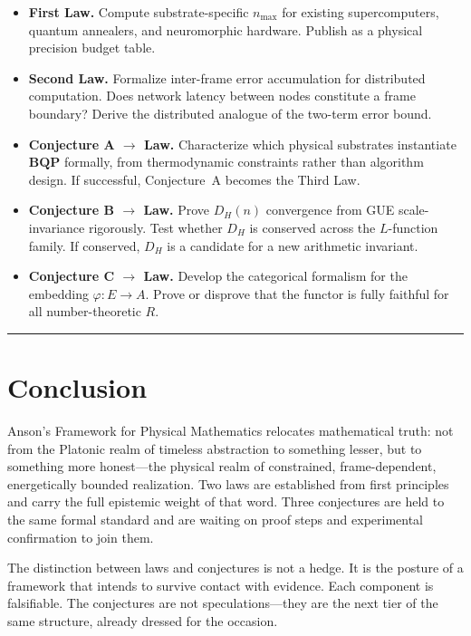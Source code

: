 \documentclass[12pt]{article}
\theoremstyle{lawstyle}
\theoremstyle{conjstyle}
\theoremstyle{predstyle}
\begin{document}
\begin{itemize}[itemsep=6pt]
  \item \textbf{First Law.} Compute substrate-specific $n_{\max}$ for existing
    supercomputers, quantum annealers, and neuromorphic hardware. Publish as a physical
    precision budget table.

  \item \textbf{Second Law.} Formalize inter-frame error accumulation for distributed
    computation. Does network latency between nodes constitute a frame boundary? Derive the
    distributed analogue of the two-term error bound.

  \item \textbf{Conjecture A $\to$ Law.} Characterize which physical substrates instantiate
    $\mathbf{BQP}$ formally, from thermodynamic constraints rather than algorithm design.
    If successful, Conjecture~A becomes the Third Law.

  \item \textbf{Conjecture B $\to$ Law.} Prove $D_H(n)$ convergence from GUE
    scale-invariance rigorously. Test whether $D_H$ is conserved across the $L$-function
    family. If conserved, $D_H$ is a candidate for a new arithmetic invariant.

  \item \textbf{Conjecture C $\to$ Law.} Develop the categorical formalism for the embedding
    $\varphi: E \to A$. Prove or disprove that the functor is fully faithful for all
    number-theoretic $R$.
\end{itemize}

\bigskip
\hrule
\bigskip

\section{Conclusion}

Anson's Framework for Physical Mathematics relocates mathematical truth: not from the
Platonic realm of timeless abstraction to something lesser, but to something more
honest---the physical realm of constrained, frame-dependent, energetically bounded
realization. Two laws are established from first principles and carry the full epistemic
weight of that word. Three conjectures are held to the same formal standard and are waiting
on proof steps and experimental confirmation to join them.

The distinction between laws and conjectures is not a hedge. It is the posture of a
framework that intends to survive contact with evidence. Each component is falsifiable. The
conjectures are not speculations---they are the next tier of the same structure, already
dressed for the occasion.
\end{document}
